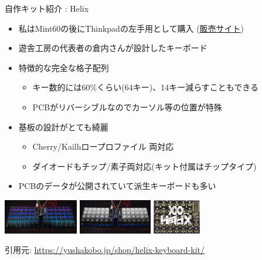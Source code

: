 \documentclass[cjk,dvipdfmx,10pt,compress,fragile%
hyperref={bookmarks=true,bookmarksnumbered=true,bookmarksopen=false,%
colorlinks=false,%
pdftitle={第 134 回 関西 Debian 勉強会},%
pdfauthor={小林},%
pdfsubject={資料},%
}]{beamer}
\begin{document}
\begin{frame}[fragile,t]{自作キット紹介 : Helix}
 \begin{itemize}
  \item 私はMint60の後にThinkpadの左手用として購入 (\href{https://yushakobo.jp/shop/helix-keyboard-kit/}{販売サイト})
  \item 遊舎工房の代表者の倉内さんが設計したキーボード
  \item 特徴的な完全な格子配列
	\begin{itemize}
	 \item キー数的には60\%くらい(64キー)、14キー減らすこともできる
	 \item PCBがリバーシブルなのでカーソル等の位置が特殊
	\end{itemize}
  \item 基板の設計がとても綺麗
	\begin{itemize}
	 \item Cherry/Kailhロープロファイル 両対応
	 \item ダイオードもチップ/素子両対応(キット付属はチップタイプ)
	\end{itemize}
  \item PCBのデータが公開されていて派生キーボードも多い
 \end{itemize}
 \begin{center}
  \includegraphics[keepaspectratio,height=1.5cm]{./img/helix-5rows-kailh.jpg}
  \hspace*{1zw}
  \includegraphics[keepaspectratio,height=1.5cm]{./img/helix-4rows-cherry.jpg}
  \hspace*{1zw}
  \includegraphics[keepaspectratio,height=1.5cm]{./img/helix-pcb.jpg}
 \end{center}
 \vspace*{-1zw}
 \begin{flushright}
  {\footnotesize 引用元: \url{https://yushakobo.jp/shop/helix-keyboard-kit/}}
 \end{flushright}
\end{frame}
\end{document}
